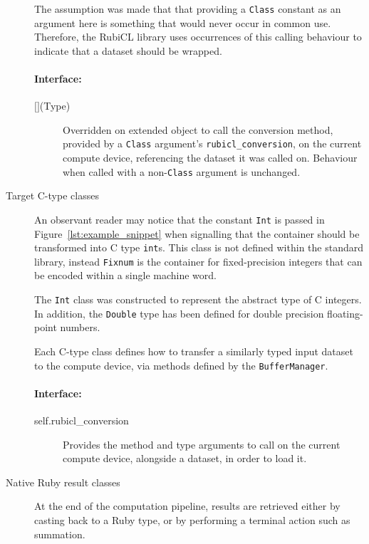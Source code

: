 \begin{description}
The assumption was made that that providing a \verb|Class| constant as an argument here is something that would never occur in common use. Therefore, the RubiCL library uses occurrences of this calling behaviour to indicate that a dataset should be wrapped.

\paragraph*{Interface:}
\begin{description}
  \item[$\lbrack\rbrack$(Type)] Overridden on extended object to call the conversion method, provided by a \verb|Class| argument's \verb|rubicl_conversion|, on the current compute device, referencing the dataset it was called on. Behaviour when called with a non-\verb|Class| argument is unchanged.
\end{description}

  \item[Target C-type classes]
An observant reader may notice that the constant \verb|Int| is passed in Figure~\ref{lst:example_snippet} when signalling that the container should be transformed into C type \verb|int|s. This class is not defined within the standard library, instead \verb|Fixnum| is the container for fixed-precision integers that can be encoded within a single machine word.

The \verb|Int| class was constructed to represent the abstract type of C integers. In addition, the \verb|Double| type has been defined for double precision floating-point numbers.

Each C-type class defines how to transfer a similarly typed input dataset to the compute device, via methods defined by the \verb|BufferManager|.

\paragraph*{Interface:}
\begin{description}
  \item[self.rubicl\_conversion] Provides the method and type arguments to call on the current compute device, alongside a dataset, in order to load it.
\end{description}

\item[Native Ruby result classes]
At the end of the computation pipeline, results are retrieved either by casting back to a Ruby type, or by performing a terminal action such as summation.


\end{description}
